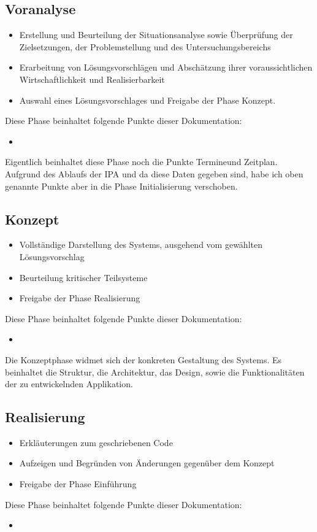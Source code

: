 \documentclass[11pt,paper=a4,final]{scrartcl}
\begin{document}
\subsection{Voranalyse}
\begin{itemize}
  \item Erstellung und Beurteilung der Situationsanalyse sowie Überprüfung der Zielsetzungen, der Problemstellung und des Untersuchungsbereichs
  \item Erarbeitung von Lösungsvorschlägen und Abschätzung ihrer voraussichtlichen Wirtschaftlichkeit und Realisierbarkeit
  \item Auswahl eines Lösungsvorschlages und Freigabe der Phase Konzept.
\end{itemize}
Diese Phase beinhaltet folgende Punkte dieser Dokumentation:
\begin{itemize}
  \item 
\end{itemize}
Eigentlich beinhaltet diese Phase noch die Punkte \glqq Termine\grqq und \glqq Zeitplan\grqq . Aufgrund des Ablaufs der IPA und da diese Daten gegeben sind, habe ich oben genannte Punkte aber in die Phase Initialisierung verschoben.
\subsection{Konzept}
\begin{itemize}
  \item Vollständige Darstellung des Systems, ausgehend vom gewählten Lösungsvorschlag
  \item Beurteilung kritischer Teilsysteme
  \item Freigabe der Phase \glqq Realisierung\grqq
\end{itemize}
Diese Phase beinhaltet folgende Punkte dieser Dokumentation:
\begin{itemize}
  \item 
\end{itemize}
Die Konzeptphase widmet sich der konkreten Gestaltung des Systems. Es beinhaltet die Struktur, die Architektur, das Design, sowie die Funktionalitäten der zu entwickelnden Applikation.
\subsection{Realisierung}
\begin{itemize}
  \item Erkläuterungen zum geschriebenen Code
  \item Aufzeigen und Begründen von Änderungen gegenüber dem Konzept
  \item Freigabe der Phase Einführung
\end{itemize}
Diese Phase beinhaltet folgende Punkte dieser Dokumentation:
\begin{itemize}
  \item 
\end{itemize}
\end{document}
